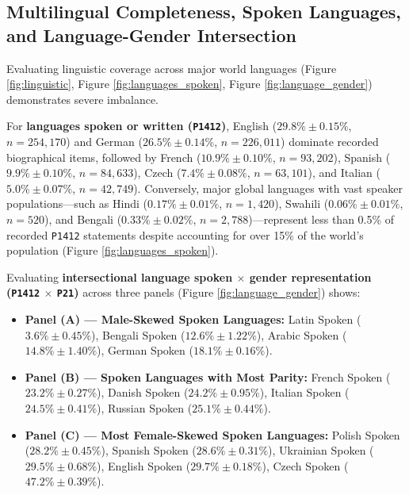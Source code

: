 \documentclass[11pt,a4paper]{article}
\begin{document}
\subsection{Multilingual Completeness, Spoken Languages, and Language-Gender Intersection}
Evaluating linguistic coverage across major world languages (Figure \ref{fig:linguistic}, Figure \ref{fig:languages_spoken}, Figure \ref{fig:language_gender}) demonstrates severe imbalance.

For \textbf{languages spoken or written (\texttt{P1412})}, English ($29.8\% \pm 0.15\%$, $n=254,170$) and German ($26.5\% \pm 0.14\%$, $n=226,011$) dominate recorded biographical items, followed by French ($10.9\% \pm 0.10\%$, $n=93,202$), Spanish ($9.9\% \pm 0.10\%$, $n=84,633$), Czech ($7.4\% \pm 0.08\%$, $n=63,101$), and Italian ($5.0\% \pm 0.07\%$, $n=42,749$). Conversely, major global languages with vast speaker populations—such as Hindi ($0.17\% \pm 0.01\%$, $n=1,420$), Swahili ($0.06\% \pm 0.01\%$, $n=520$), and Bengali ($0.33\% \pm 0.02\%$, $n=2,788$)—represent less than 0.5\% of recorded \texttt{P1412} statements despite accounting for over 15\% of the world's population \cite{undesa2024prospects} (Figure \ref{fig:languages_spoken}).

Evaluating \textbf{intersectional language spoken $\times$ gender representation (\texttt{P1412} $\times$ \texttt{P21})} across three panels (Figure \ref{fig:language_gender}) shows:
\begin{itemize}
    \item \textbf{Panel (A) — Male-Skewed Spoken Languages:} Latin Spoken ($3.6\% \pm 0.45\%$), Bengali Spoken ($12.6\% \pm 1.22\%$), Arabic Spoken ($14.8\% \pm 1.40\%$), German Spoken ($18.1\% \pm 0.16\%$).
    \item \textbf{Panel (B) — Spoken Languages with Most Parity:} French Spoken ($23.2\% \pm 0.27\%$), Danish Spoken ($24.2\% \pm 0.95\%$), Italian Spoken ($24.5\% \pm 0.41\%$), Russian Spoken ($25.1\% \pm 0.44\%$).
    \item \textbf{Panel (C) — Most Female-Skewed Spoken Languages:} Polish Spoken ($28.2\% \pm 0.45\%$), Spanish Spoken ($28.6\% \pm 0.31\%$), Ukrainian Spoken ($29.5\% \pm 0.68\%$), English Spoken ($29.7\% \pm 0.18\%$), Czech Spoken ($47.2\% \pm 0.39\%$).
\end{itemize}
\end{document}
